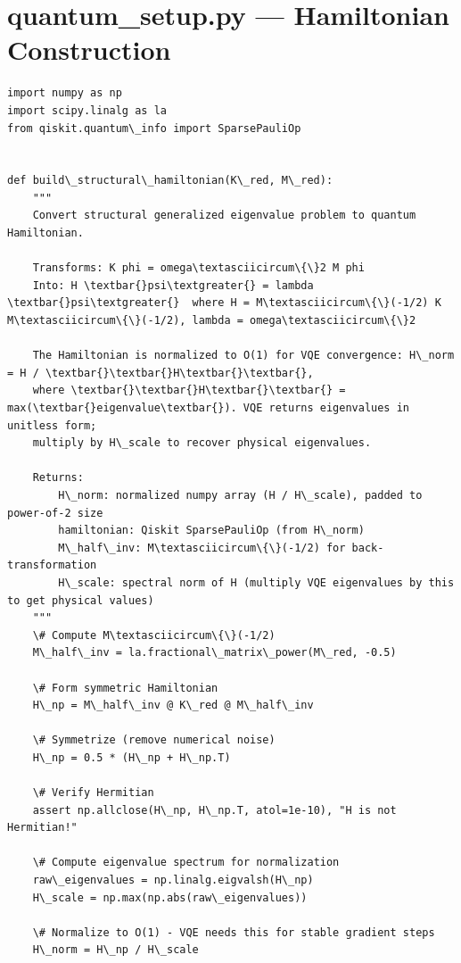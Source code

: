 \documentclass[12pt, a4paper]{article}
\begin{document}
\section{quantum_setup.py --- Hamiltonian Construction}
\begin{lstlisting}[style=codestyle, caption={{quantum_setup.py --- Hamiltonian Construction}}]
import numpy as np
import scipy.linalg as la
from qiskit.quantum\_info import SparsePauliOp


def build\_structural\_hamiltonian(K\_red, M\_red):
    """
    Convert structural generalized eigenvalue problem to quantum Hamiltonian.

    Transforms: K phi = omega\textasciicircum\{\}2 M phi
    Into: H \textbar{}psi\textgreater{} = lambda \textbar{}psi\textgreater{}  where H = M\textasciicircum\{\}(-1/2) K M\textasciicircum\{\}(-1/2), lambda = omega\textasciicircum\{\}2

    The Hamiltonian is normalized to O(1) for VQE convergence: H\_norm = H / \textbar{}\textbar{}H\textbar{}\textbar{},
    where \textbar{}\textbar{}H\textbar{}\textbar{} = max(\textbar{}eigenvalue\textbar{}). VQE returns eigenvalues in unitless form;
    multiply by H\_scale to recover physical eigenvalues.

    Returns:
        H\_norm: normalized numpy array (H / H\_scale), padded to power-of-2 size
        hamiltonian: Qiskit SparsePauliOp (from H\_norm)
        M\_half\_inv: M\textasciicircum\{\}(-1/2) for back-transformation
        H\_scale: spectral norm of H (multiply VQE eigenvalues by this to get physical values)
    """
    \# Compute M\textasciicircum\{\}(-1/2)
    M\_half\_inv = la.fractional\_matrix\_power(M\_red, -0.5)

    \# Form symmetric Hamiltonian
    H\_np = M\_half\_inv @ K\_red @ M\_half\_inv

    \# Symmetrize (remove numerical noise)
    H\_np = 0.5 * (H\_np + H\_np.T)

    \# Verify Hermitian
    assert np.allclose(H\_np, H\_np.T, atol=1e-10), "H is not Hermitian!"

    \# Compute eigenvalue spectrum for normalization
    raw\_eigenvalues = np.linalg.eigvalsh(H\_np)
    H\_scale = np.max(np.abs(raw\_eigenvalues))

    \# Normalize to O(1) - VQE needs this for stable gradient steps
    H\_norm = H\_np / H\_scale


\end{lstlisting}
\end{document}
